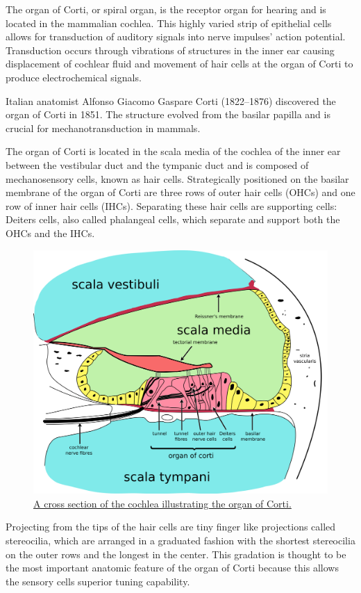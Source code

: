 The organ of Corti, or spiral organ, is the receptor organ for hearing and is located in the mammalian cochlea. This highly varied strip of epithelial cells allows for transduction of auditory signals into nerve impulses' action potential. Transduction occurs through vibrations of structures in the inner ear causing displacement of cochlear fluid and movement of hair cells at the organ of Corti to produce electrochemical signals.

Italian anatomist Alfonso Giacomo Gaspare Corti (1822--1876) discovered the organ of Corti in 1851. The structure evolved from the basilar papilla and is crucial for mechanotransduction in mammals.

The organ of Corti is located in the scala media of the cochlea of the inner ear between the vestibular duct and the tympanic duct and is composed of mechanosensory cells, known as hair cells. Strategically positioned on the basilar membrane of the organ of Corti are three rows of outer hair cells (OHCs) and one row of inner hair cells (IHCs). Separating these hair cells are supporting cells: Deiters cells, also called phalangeal cells, which separate and support both the OHCs and the IHCs.



\begin{figure}

{\centering \includegraphics[width=0.7\linewidth]{./figures/auditory/Cochlea-crosssection} 

}

\caption{\href{https://commons.wikimedia.org/wiki/File:Cochlea-crosssection.svg}{A cross section of the cochlea illustrating the organ of Corti.}}\label{fig:organcorti}
\end{figure}

Projecting from the tips of the hair cells are tiny finger like projections called stereocilia, which are arranged in a graduated fashion with the shortest stereocilia on the outer rows and the longest in the center. This gradation is thought to be the most important anatomic feature of the organ of Corti because this allows the sensory cells superior tuning capability.

